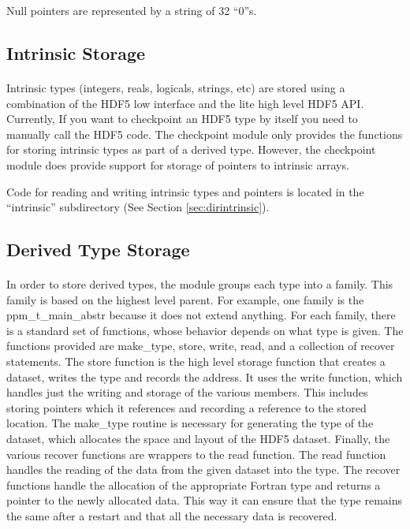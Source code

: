 \documentclass{article}
\begin{document}
Null pointers are represented by a string of 32 ``0''s.
\subsection{Intrinsic Storage}
\paragraph{}
Intrinsic types (integers, reals, logicals, strings, etc) are stored using a combination of the HDF5 low interface and the lite high level HDF5 API. Currently, If you want to checkpoint an HDF5 type by itself you need to manually call the HDF5 code. The checkpoint module only provides the functions for storing intrinsic types as part of a derived type. However, the checkpoint module does provide support for storage of pointers to intrinsic arrays.

Code for reading and writing intrinsic types and pointers is located in the ``intrinsic'' subdirectory (See Section \ref{sec:dirintrinsic}).

\subsection{Derived Type Storage}
\paragraph{}
In order to store derived types, the module groups each type into a family. This family is based on the highest level parent. For example, one family is the ppm\_t\_main\_abstr because it does not extend anything. For each family, there is a standard set of functions, whose behavior depends on what type is given. The functions provided are make\_type, store, write, read, and a collection of recover statements. The store function is the high level storage function that creates a dataset, writes the type and records the address. It uses the write function, which handles just the writing and storage of the various members. This includes storing pointers which it references and recording a reference to the stored location. The make\_type routine is necessary for generating the type of the dataset, which allocates the space and layout of the HDF5 dataset. Finally, the various recover functions are wrappers to the read function. The read function handles the reading of the data from the given dataset into the type. The recover functions handle the allocation of the appropriate Fortran type and returns a pointer to the newly allocated data. This way it can ensure that the type remains the same after a restart and that all the necessary data is recovered.
\end{document}
